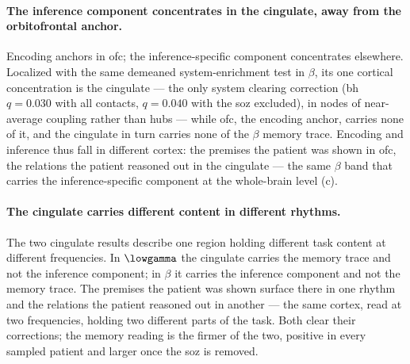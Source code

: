 \paragraph{The inference component concentrates in the cingulate, away from the orbitofrontal anchor.}
Encoding anchors in \gls{ofc}; the inference-specific component concentrates elsewhere. Localized with the same demeaned system-enrichment test in \(\beta\), its one cortical concentration is the cingulate --- the only system clearing correction (\gls{bh} \(q = 0.030\) with all contacts, \(q = 0.040\) with the \gls{soz} excluded), in nodes of near-average coupling rather than hubs --- while \gls{ofc}, the encoding anchor, carries none of it, and the cingulate in turn carries none of the \(\beta\) memory trace. Encoding and inference thus fall in different cortex: the premises the patient was shown in \gls{ofc}, the relations the patient reasoned out in the cingulate --- the same \(\beta\) band that carries the inference-specific component at the whole-brain level (c).

\paragraph{The cingulate carries different content in different rhythms.}
The two cingulate results describe one region holding different task content at different frequencies. In \(\lowgamma\) the cingulate carries the memory trace and not the inference component; in \(\beta\) it carries the inference component and not the memory trace. The premises the patient was shown surface there in one rhythm and the relations the patient reasoned out in another --- the same cortex, read at two frequencies, holding two different parts of the task. Both clear their corrections; the memory reading is the firmer of the two, positive in every sampled patient and larger once the \gls{soz} is removed.

